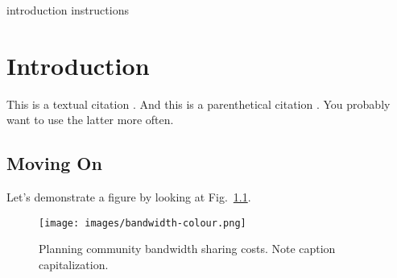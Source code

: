 introduction instructions
\chapter{Introduction}
This is a textual citation \citet{shannon44}. And this is a parenthetical citation \citep{shannon44}. You probably want to use the latter more often.

\section{Moving On}
Let's demonstrate a figure by looking at Fig.~\ref{bandwidth}. 

\begin{figure}[!h]
\centering 
\texttt{[image: images/bandwidth-colour.png]}
\caption{Planning community bandwidth sharing costs. 
  Note caption capitalization.}
\label{bandwidth} 
\end{figure}









